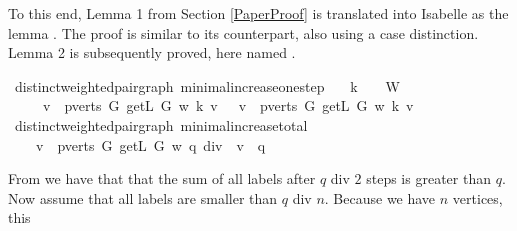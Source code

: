 \begin{isabellebody}
\begin{isamarkuptext}
To this end, Lemma 1 from Section \ref{PaperProof} is translated into Isabelle as the lemma
. The proof is 
similar to its counterpart, also using a case distinction. Lemma 2 is subsequently proved, here
named .%
\end{isamarkuptext}\isamarkuptrue%
\isamarkupfalse%
{\isacharparenleft}\ distinct{\isacharunderscore}weighted{\isacharunderscore}pair{\isacharunderscore}graph{\isacharparenright}\ minimal{\isacharunderscore}increase{\isacharunderscore}one{\isacharunderscore}step{\isacharcolon}\isanewline
\ \ \ {\isachardoublequoteopen}k\ {\isacharplus}\ {}\ {\isasymin}\ W{\isachardoublequoteclose}\isanewline
\ \ \ \isanewline
\ \ \ \ {\isachardoublequoteopen}{\isacharparenleft}{\isasymSum}\ v\ {\isasymin}\ pverts\ G{\isachardot}\ getL\ G\ w\ {\isacharparenleft}k{\isacharplus}{}{\isacharparenright}\ v{\isacharparenright}\ {\isasymge}\ {\isacharparenleft}{\isasymSum}\ v\ {\isasymin}\ pverts\ G{\isachardot}\ getL\ G\ w\ k\ v{\isacharparenright}\ {\isacharplus}\ {}{\isachardoublequoteclose}\ \isanewline
%
\isadelimproof
%
\endisadelimproof
%
\isatagproof
%
\endisatagproof
{\isafoldproof}%
%
\isadelimproof
%
\endisadelimproof
%
\isadelimproof
%
\endisadelimproof
%
\isatagproof
%
\endisatagproof
{\isafoldproof}%
%
\isadelimproof
\isanewline
%
\endisadelimproof
\isanewline
{}\isamarkupfalse%
{\isacharparenleft}\ distinct{\isacharunderscore}weighted{\isacharunderscore}pair{\isacharunderscore}graph{\isacharparenright}\ minimal{\isacharunderscore}increase{\isacharunderscore}total{\isacharcolon}\isanewline
\ \ \ {\isachardoublequoteopen}{\isacharparenleft}{\isasymSum}\ v\ {\isasymin}\ pverts\ G{\isachardot}\ getL\ G\ w\ {\isacharparenleft}q\ div\ {}{\isacharparenright}\ v{\isacharparenright}\ {\isasymge}\ q{\isachardoublequoteclose}%
\isadelimproof
%
\endisadelimproof
%
\isatagproof
%
\endisatagproof
{\isafoldproof}%
%
\isadelimproof
%
\endisadelimproof
%
\isadelimproof
%
\endisadelimproof
%
\isatagproof
%
\endisatagproof
{\isafoldproof}%
%
\isadelimproof
%
\endisadelimproof
%
\begin{isamarkuptext}%
From  we have that that the sum of all labels after $q$ div $2$ steps is 
greater than $q$. Now assume that all labels are smaller than $q$ div $n$. Because we have $n$ vertices, this

\end{isamarkuptext}
\end{isabellebody}
